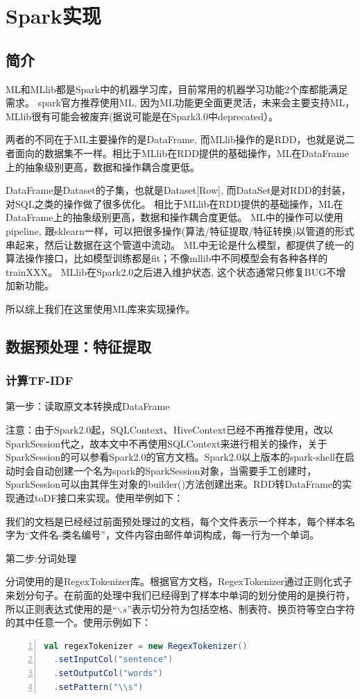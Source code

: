 \documentclass[lang=cn,11pt]{elegantpaper}
\begin{document}
\section{Spark实现}
\subsection{简介}
ML和MLlib都是Spark中的机器学习库，目前常用的机器学习功能2个库都能满足需求。
spark官方推荐使用ML, 因为ML功能更全面更灵活，未来会主要支持ML，MLlib很有可能会被废弃(据说可能是在Spark3.0中deprecated）。

两者的不同在于ML主要操作的是DataFrame, 而MLlib操作的是RDD，也就是说二者面向的数据集不一样。相比于MLlib在RDD提供的基础操作，ML在DataFrame上的抽象级别更高，数据和操作耦合度更低。

DataFrame是Dataset的子集，也就是Dataset[Row], 而DataSet是对RDD的封装，对SQL之类的操作做了很多优化。
相比于MLlib在RDD提供的基础操作，ML在DataFrame上的抽象级别更高，数据和操作耦合度更低。
ML中的操作可以使用pipeline, 跟sklearn一样，可以把很多操作(算法/特征提取/特征转换)以管道的形式串起来，然后让数据在这个管道中流动。
ML中无论是什么模型，都提供了统一的算法操作接口，比如模型训练都是fit；不像mllib中不同模型会有各种各样的trainXXX。
MLlib在Spark2.0之后进入维护状态, 这个状态通常只修复BUG不增加新功能。

所以综上我们在这里使用ML库来实现操作。
\subsection{数据预处理：特征提取}
\subsubsection{计算TF-IDF}
第一步：读取原文本转换成DataFrame

注意：由于Spark2.0起，SQLContext、HiveContext已经不再推荐使用，改以SparkSession代之，故本文中不再使用SQLContext来进行相关的操作，关于SparkSession的可以参看Spark2.0的官方文档。Spark2.0以上版本的spark-shell在启动时会自动创建一个名为spark的SparkSession对象，当需要手工创建时，SparkSession可以由其伴生对象的builder()方法创建出来。RDD转DataFrame的实现通过toDF接口来实现。使用举例如下：


我们的文档是已经经过前面预处理过的文档，每个文件表示一个样本，每个样本名字为“文件名-类名编号”，文件内容由邮件单词构成，每一行为一个单词。

第二步:分词处理

分词使用的是RegexTokenizer库。根据官方文档，RegexTokenizer通过正则化式子来划分句子。在前面的处理中我们已经得到了样本中单词的划分使用的是换行符，所以正则表达式使用的是“$\backslash s$”表示切分符为包括空格、制表符、换页符等空白字符的其中任意一个。使用示例如下：
\begin{lstlisting}[language={Scala},numbers=left,numberstyle=\tiny,%frame=shadowbox,  
  rulesepcolor=\color{red!20!green!20!blue!20},  
  keywordstyle=\color{blue!70!black},  
  commentstyle=\color{blue!90!},  
  basicstyle=\ttfamily]  
val regexTokenizer = new RegexTokenizer()
  .setInputCol("sentence")
  .setOutputCol("words")
  .setPattern("\\s")
\end{lstlisting}\par
\end{document}
